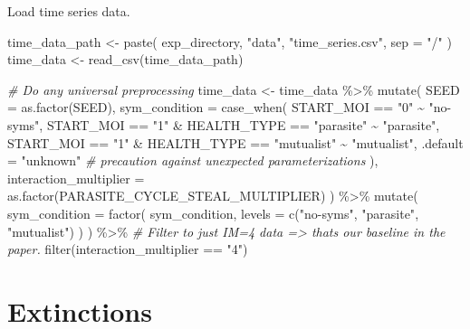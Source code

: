 \documentclass[
]{book}
\newenvironment{Shaded}{\begin{snugshade}}{\end{snugshade}}
\newcommand{\AttributeTok}[1]{\textcolor[rgb]{0.77,0.63,0.00}{#1}}
\newcommand{\CommentTok}[1]{\textcolor[rgb]{0.56,0.35,0.01}{\textit{#1}}}
\newcommand{\FunctionTok}[1]{\textcolor[rgb]{0.00,0.00,0.00}{#1}}
\newcommand{\NormalTok}[1]{#1}
\newcommand{\OtherTok}[1]{\textcolor[rgb]{0.56,0.35,0.01}{#1}}
\newcommand{\SpecialCharTok}[1]{\textcolor[rgb]{0.00,0.00,0.00}{#1}}
\newcommand{\StringTok}[1]{\textcolor[rgb]{0.31,0.60,0.02}{#1}}
\begin{document}
Load time series data.

\begin{Shaded}
\begin{Highlighting}[]
\NormalTok{time\_data\_path }\OtherTok{\textless{}{-}} \FunctionTok{paste}\NormalTok{(}
\NormalTok{  exp\_directory,}
  \StringTok{"data"}\NormalTok{,}
  \StringTok{"time\_series.csv"}\NormalTok{,}
  \AttributeTok{sep =} \StringTok{"/"}
\NormalTok{)}
\NormalTok{time\_data }\OtherTok{\textless{}{-}} \FunctionTok{read\_csv}\NormalTok{(time\_data\_path)}

\CommentTok{\# Do any universal preprocessing}
\NormalTok{time\_data }\OtherTok{\textless{}{-}}\NormalTok{ time\_data }\SpecialCharTok{\%\textgreater{}\%}
  \FunctionTok{mutate}\NormalTok{(}
    \AttributeTok{SEED =} \FunctionTok{as.factor}\NormalTok{(SEED),}
    \AttributeTok{sym\_condition =} \FunctionTok{case\_when}\NormalTok{(}
\NormalTok{      START\_MOI }\SpecialCharTok{==} \StringTok{"0"} \SpecialCharTok{\textasciitilde{}} \StringTok{"no{-}syms"}\NormalTok{,}
\NormalTok{      START\_MOI }\SpecialCharTok{==} \StringTok{"1"} \SpecialCharTok{\&}\NormalTok{ HEALTH\_TYPE }\SpecialCharTok{==} \StringTok{"parasite"} \SpecialCharTok{\textasciitilde{}} \StringTok{"parasite"}\NormalTok{,}
\NormalTok{      START\_MOI }\SpecialCharTok{==} \StringTok{"1"} \SpecialCharTok{\&}\NormalTok{ HEALTH\_TYPE }\SpecialCharTok{==} \StringTok{"mutualist"} \SpecialCharTok{\textasciitilde{}} \StringTok{"mutualist"}\NormalTok{,}
      \AttributeTok{.default =} \StringTok{"unknown"} \CommentTok{\# precaution against unexpected parameterizations}
\NormalTok{    ),}
    \AttributeTok{interaction\_multiplier =} \FunctionTok{as.factor}\NormalTok{(PARASITE\_CYCLE\_STEAL\_MULTIPLIER)}
\NormalTok{  ) }\SpecialCharTok{\%\textgreater{}\%}
  \FunctionTok{mutate}\NormalTok{(}
    \AttributeTok{sym\_condition =} \FunctionTok{factor}\NormalTok{(}
\NormalTok{      sym\_condition,}
      \AttributeTok{levels =} \FunctionTok{c}\NormalTok{(}\StringTok{"no{-}syms"}\NormalTok{, }\StringTok{"parasite"}\NormalTok{, }\StringTok{"mutualist"}\NormalTok{)}
\NormalTok{    )}
\NormalTok{  ) }\SpecialCharTok{\%\textgreater{}\%}
  \CommentTok{\# Filter to just IM=4 data =\textgreater{} that\textquotesingle{}s our baseline in the paper.}
  \FunctionTok{filter}\NormalTok{(interaction\_multiplier }\SpecialCharTok{==} \StringTok{"4"}\NormalTok{)}
\end{Highlighting}
\end{Shaded}

\hypertarget{extinctions}{%
\section{Extinctions}\label{extinctions}}
\end{document}
